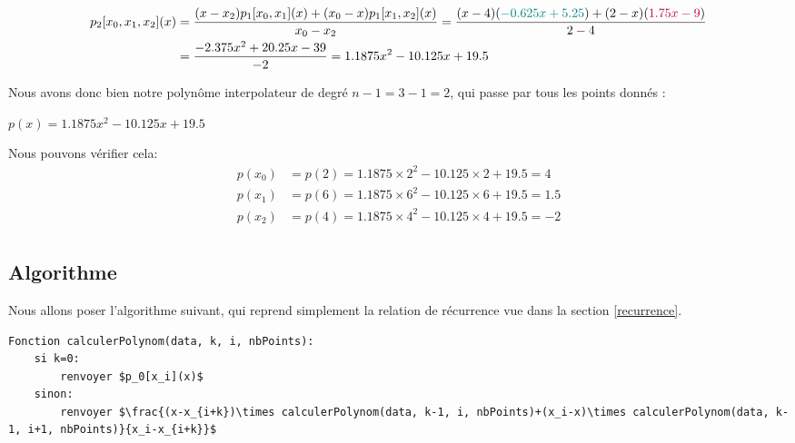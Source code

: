 \begin{center}
    \begin{align*}
        p_2[x_0, x_1, x_2](x)&=\frac{(x-x_2)p_1[x_0, x_1](x)+(x_0-x)p_1[x_1, x_2](x)}{x_0-x_2}=\frac{(x-4)(\textcolor{teal}{-0.625x+5.25})+(2-x)(\textcolor{purple}{1.75x-9})}{2-4}\vspace{4pt}\\&=\frac{-2.375x^2+20.25x-39}{-2}=1.1875x^2-10.125x+19.5\vspace{4pt}\\
    \end{align*}
\end{center}
Nous avons donc bien notre polynôme interpolateur de degré $n-1=3-1=2$, qui passe par tous les points donnés :\\
\begin{center}
    $p(x)=1.1875x^2-10.125x+19.5$\\
\end{center}
Nous pouvons vérifier cela:
\begin{align*}
    p(x_0)&=p(2)=1.1875\times 2^2-10.125\times 2+19.5=4\\
    p(x_1)&=p(6)=1.1875\times 6^2-10.125\times 6+19.5=1.5\\
    p(x_2)&=p(4)=1.1875\times 4^2-10.125\times 4+19.5=-2\\
\end{align*}
\subsection{Algorithme}
Nous allons poser l'algorithme suivant, qui reprend simplement la relation de récurrence vue dans la section \ref{recurrence}.
\begin{lstlisting}[mathescape=true, frame=single, basicstyle=\linespread{1.5}\fontsize{8}{10}\selectfont]
Fonction calculerPolynom(data, k, i, nbPoints):
    si k=0:
        renvoyer $p_0[x_i](x)$
    sinon:
        renvoyer $\frac{(x-x_{i+k})\times calculerPolynom(data, k-1, i, nbPoints)+(x_i-x)\times calculerPolynom(data, k-1, i+1, nbPoints)}{x_i-x_{i+k}}$
\end{lstlisting}
